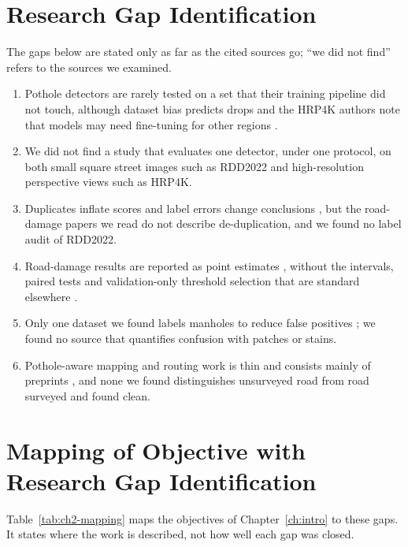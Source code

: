 \section{Research Gap Identification}
The gaps below are stated only as far as the cited sources go; ``we did not find'' refers to the sources we examined.
\begin{enumerate}[label=G\arabic*.,ref=G\arabic*,itemsep=0pt]
  \item \label{gap:generalisation} Pothole detectors are rarely tested on a set that their training pipeline did not touch, although dataset bias predicts drops \cite{torralba2011unbiased,koh2021wilds} and the HRP4K authors note that models may need fine-tuning for other regions \cite{chen2026hrp4k}.
  \item \label{gap:viewpoint} We did not find a study that evaluates one detector, under one protocol, on both small square street images such as RDD2022 and high-resolution perspective views such as HRP4K.
  \item \label{gap:leakage} Duplicates inflate scores \cite{barz2020train} and label errors change conclusions \cite{northcutt2021pervasive}, but the road-damage papers we read do not describe de-duplication, and we found no label audit of RDD2022.
  \item \label{gap:evaluation} Road-damage results are reported as point estimates \cite{zeng2024yolov8pd}, without the intervals, paired tests and validation-only threshold selection that are standard elsewhere \cite{efron1993bootstrap,koehn2004significance,cawley2010overfitting}.
  \item \label{gap:lookalikes} Only one dataset we found labels manholes to reduce false positives \cite{giordani2026roaddamage}; we found no source that quantifies confusion with patches or stains.
  \item \label{gap:routing} Pothole-aware mapping and routing work is thin and consists mainly of preprints \cite{balakuntala2013pothole,sahoo2025iwatchroadv2}, and none we found distinguishes unsurveyed road from road surveyed and found clean.
\end{enumerate}

\section{Mapping of Objective with Research Gap Identification}
Table~\ref{tab:ch2-mapping} maps the objectives of Chapter~\ref{ch:intro} to these gaps. It states where the work is described, not how well each gap was closed.

